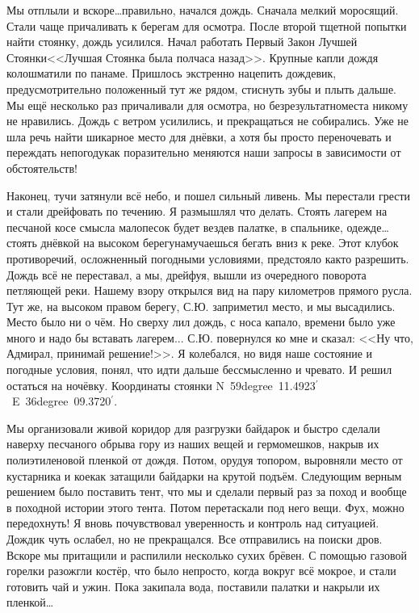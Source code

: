 Мы отплыли и вскоре\ldots  правильно, начался дождь. Сначала мелкий моросящий. Стали чаще причаливать к берегам для осмотра. После второй тщетной попытки найти стоянку, дождь усилился. Начал работать Первый Закон Лучшей Стоянки\mdash <<Лучшая Стоянка была полчаса назад>>. Крупные капли дождя колошматили по панаме. Пришлось экстренно нацепить дождевик, предусмотрительно положенный тут же рядом, стиснуть зубы и плыть дальше. Мы ещё несколько раз причаливали для осмотра, но безрезультатно\mdash места никому не нравились. Дождь с ветром усилились, и прекращаться не собирались. Уже не шла речь найти шикарное место для днёвки, а хотя бы просто переночевать и переждать непогоду\mdash как поразительно меняются наши запросы в зависимости от обстоятельств!

Наконец, тучи затянули всё небо, и пошел сильный ливень. Мы перестали грести и стали дрейфовать по течению. Я размышлял что делать. Стоять лагерем на песчаной косе смысла мало\mdash песок будет везде\mdash в палатке, в спальнике, одежде\ldots  стоять днёвкой на высоком берегу\mdash намучаешься бегать вниз к реке. Этот клубок противоречий, осложненный погодными условиями, предстояло как\sdash то разрешить. Дождь всё не переставал, а мы, дрейфуя, вышли из очередного поворота петляющей реки. Нашему взору открылся вид на пару километров прямого русла. Тут же, на высоком правом берегу, С.Ю. заприметил место, и мы высадились. Место было ни о чём. Но сверху лил дождь, с носа капало, времени было уже много и надо бы вставать лагерем... С.Ю. повернулся ко мне и сказал: <<Ну что, Адмирал, принимай решение!>>. Я колебался, но видя наше состояние и погодные условия, понял, что идти дальше бессмысленно и чревато. И решил остаться на ночёвку. Координаты стоянки N~59degree~11.4923$^\prime$~E~36degree~09.3720$^\prime$.

Мы организовали живой коридор для разгрузки байдарок и быстро сделали наверху песчаного обрыва гору из наших вещей и гермомешков, накрыв их полиэтиленовой пленкой от дождя. Потом, орудуя топором, выровняли место от кустарника и кое\sdash как затащили байдарки на крутой подъём. Следующим верным решением было поставить тент, что мы и сделали первый раз за поход и вообще в походной истории этого тента. Потом перетаскали под него вещи. Фух, можно передохнуть! Я вновь почувствовал уверенность и контроль над ситуацией. Дождик чуть ослабел, но не прекращался. Все отправились на поиски дров. Вскоре мы притащили и распилили несколько сухих брёвен. С помощью газовой горелки разожгли костёр, что было непросто, когда вокруг всё мокрое, и стали готовить чай и ужин. Пока закипала вода, поставили палатки и накрыли их пленкой\ldots  

